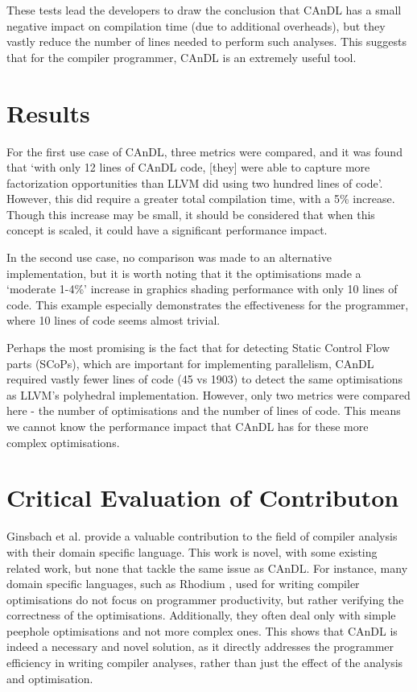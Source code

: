 \documentclass[12pt]{article}
\begin{document}
These tests lead the developers to draw the conclusion that CAnDL has a small negative impact on compilation time (due to additional overheads), but they vastly reduce the number of lines needed to perform such analyses. This suggests that for the compiler programmer, CAnDL is an extremely useful tool. 

\section{Results}

For the first use case of CAnDL, three metrics were compared, and it was found that `with only 12 lines of CAnDL code, [they]
were able to capture more factorization opportunities than
LLVM did using two hundred lines of code'. However, this did require a greater total compilation time, with a 5\% increase. Though this increase may be small, it should be considered that when this concept is scaled, it could have a significant performance impact. 

In the second use case, no comparison was made to an alternative implementation, but it is worth noting that it the optimisations made a `moderate 1-4\%' increase in graphics shading performance with only 10 lines of code. This example especially demonstrates the effectiveness for the programmer, where 10 lines of code seems almost trivial. 

Perhaps the most promising is the fact that for detecting Static Control Flow parts (SCoPs), which are important for implementing parallelism, CAnDL required vastly fewer lines of code (45 vs 1903) to detect the same optimisations as LLVM's polyhedral implementation. However, only two metrics were compared here - the number of optimisations and the number of lines of code. This means we cannot know the performance impact that CAnDL has for these more complex optimisations. 

\section{Critical Evaluation of Contributon}

Ginsbach et al. provide a valuable contribution to the field of compiler analysis with their domain specific language. This work is novel, with some existing related work, but none that tackle the same issue as CAnDL. For instance, many domain specific languages, such as Rhodium \cite{Lerner2005}, used for writing compiler optimisations do not focus on programmer productivity, but rather verifying the correctness of the optimisations. Additionally, they often deal only with simple peephole optimisations and not more complex ones. This shows that CAnDL is indeed a necessary and novel solution, as it directly addresses the programmer efficiency in writing compiler analyses, rather than just the effect of the analysis and optimisation. 
\end{document}
